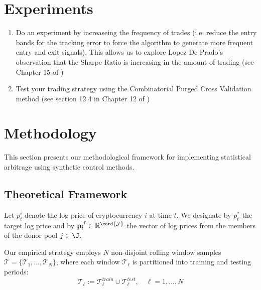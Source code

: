 \section{Experiments}
\begin{enumerate}
  \item Do an experiment by increaseing the frequency of trades (i.e: reduce the entry bands for the tracking error to force the algorithm to generate more frequent entry and exit signals). This allows us to explore Lopez De Prado's observation that the Sharpe Ratio is increasing in the amount of trading (see Chapter 15 of )

  \item Test your trading strategy using the Combinatorial Purged Cross Validation method (see section 12.4 in Chapter 12 of )
\end{enumerate}




\section{Methodology}

This section presents our methodological framework for implementing statistical arbitrage using synthetic control methods. 

\subsection{Theoretical Framework}


Let $p_{t}^{i}$ denote the log price of cryptocurrency $i$ at time $t$. We designate by $p_t^*$ the target log price and by $\mathbf{p}_t^{\mathcal{J}}\in \mathbb{R}^{\card{\mathcal{J}}}$ the vector of log prices from the members of the donor pool $j\in \J$.


\mx 
Our empirical strategy employs $N$ non-disjoint rolling window samples $\mathcal{T} = \{\mathcal{T}_1, \ldots, \mathcal{T}_N\}$, where each window $\mathcal{T}_{\ell}$ is partitioned into training and testing periods:
$$
\mathcal{T}_{\ell} := \mathcal{T}^{train}_{\ell} \cup \mathcal{T}^{test}_{\ell}
, \quad \ell=1, \ldots, N
$$

